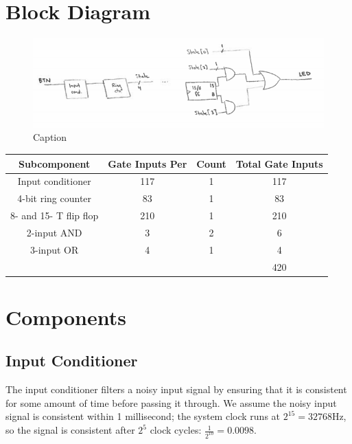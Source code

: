 \documentclass{article}
\begin{document}
\section{Block Diagram}
\begin{figure}[!ht]
\centering
\includegraphics[width=\textwidth]{img/led-controller}
\caption{Caption}
\label{fig:led-controller}
\end{figure}

\begin{center}
\begin{tabular}{ ccc|c }
 \textbf{Subcomponent} & \textbf{Gate Inputs Per} & \textbf{Count} & \textbf{Total Gate Inputs} \\
 \hline
 Input conditioner & 117 & 1 & 117 \\
 4-bit ring counter & 83 & 1 & 83 \\
 8- and 15- T flip flop & 210 & 1 & 210 \\
 2-input AND & 3 & 2 & 6 \\
 3-input OR & 4 & 1 & 4 \\
 \hline
 &&& 420\\
\end{tabular}
\end{center}

\newpage

\section{Components}

\subsection{Input Conditioner}
The input conditioner filters a noisy input signal by ensuring that it is consistent for some amount of time before passing it through. We assume the noisy input signal is consistent within 1 millisecond; the system clock runs at $2^{15} = 32768$Hz, so the signal is consistent after $2^5$ clock cycles: $\frac{1}{2^{10}} = 0.0098$.\\
\end{document}
